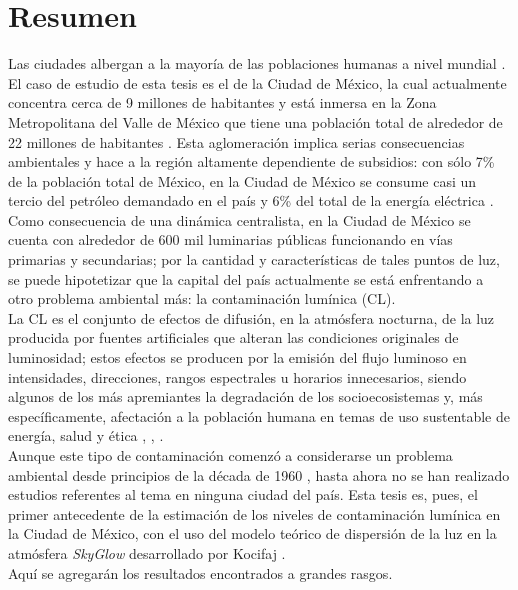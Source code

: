 \chapter{Resumen}

Las ciudades albergan a la mayoría de las poblaciones humanas a nivel mundial \citep{Zari2018}. El caso de estudio de esta tesis es el de la Ciudad de México, la cual actualmente concentra cerca de 9 millones de habitantes \citep{INEGI2015} y está inmersa en la Zona Metropolitana del Valle de México que tiene una población total de alrededor de 22 millones de habitantes \citep{OCDE2015}. Esta aglomeración implica serias consecuencias ambientales y hace a la región altamente dependiente de subsidios: con sólo 7\% de la población total de México, en la Ciudad de México se consume casi un tercio del petróleo demandado en el país y 6\% del total de la energía eléctrica \citep{SENER2013}.\\

Como consecuencia de una dinámica centralista, en la Ciudad de México se cuenta con alrededor de 600 mil luminarias públicas funcionando en vías primarias y secundarias; por la cantidad y características de tales puntos de luz, se puede hipotetizar que la capital del país actualmente se está enfrentando a otro problema ambiental más: la contaminación lumínica (CL).\\

La CL es el conjunto de efectos de difusión, en la atmósfera nocturna, de la luz producida por fuentes artificiales que alteran las condiciones originales de luminosidad; estos efectos se producen por la emisión del flujo luminoso en intensidades, direcciones, rangos espectrales u horarios innecesarios, siendo algunos de los más apremiantes la degradación de los socioecosistemas y, más específicamente, afectación a la población humana en temas de uso sustentable de energía, salud y ética \citep{AtlasREPSA}, \citep{LibroCL}, \citep{Stone2017}.\\

Aunque este tipo de contaminación comenzó a considerarse un problema ambiental desde principios de la década de 1960 \citep{LibroCL}, hasta ahora no se han realizado estudios referentes al tema en ninguna ciudad del país. Esta tesis es, pues, el primer antecedente de la estimación de los niveles de contaminación lumínica en la Ciudad de México, con el uso del modelo teórico de dispersión de la luz en la atmósfera \textit{SkyGlow} desarrollado por Kocifaj \citep{Kocifaj2007}.\\

Aquí se agregarán los resultados encontrados a grandes rasgos.

